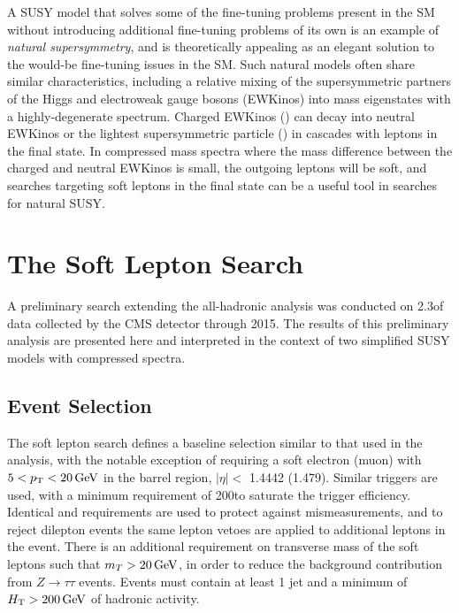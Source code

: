 A SUSY model that solves some of the fine-tuning problems present in the SM without introducing additional fine-tuning problems of its own is an example of {\it natural supersymmetry}, and is theoretically appealing as an elegant solution to the would-be fine-tuning issues in the SM. Such natural models often share similar characteristics, including a relative mixing of the supersymmetric partners of the Higgs and electroweak gauge bosons (EWKinos) into mass eigenstates with a highly-degenerate spectrum. Charged EWKinos (\chipm) can decay into neutral EWKinos or the lightest supersymmetric particle (\chiz) in cascades with leptons in the final state. In compressed mass spectra where the mass difference between the charged and neutral EWKinos is small, the outgoing leptons will be soft, and searches targeting soft leptons in the final state can be a useful tool in searches for natural SUSY.

\section{The Soft Lepton Search}
\label{sec:softlep}

A preliminary search extending the all-hadronic analysis was conducted on 2.3\fbinv of data collected by the CMS detector through 2015. The results of this preliminary analysis are presented here and interpreted in the context of two simplified SUSY models with compressed spectra.

\subsection{Event Selection}
\label{subsec:softevents}
The soft lepton search defines a baseline selection similar to that used in the \mttwo analysis, with the notable exception of requiring a soft electron (muon) with $5 < p_{\mathrm{T}} < 20\,\text{Ge\hspace{-.08em}V}$ in the barrel region, $|\eta| <$ 1.4442 (1.479). Similar \MET triggers are used, with a minimum \MET requirement of 200\GeV to saturate the trigger efficiency. Identical \dphilong and \htovermet requirements are used to protect against \MET mismeasurements, and
to reject dilepton events the same lepton vetoes are applied to additional leptons in the event. There is an additional requirement on transverse mass of the soft leptons such that $m_T > 20\,\text{Ge\hspace{-.08em}V}$, in order to reduce the background contribution from $Z\rightarrow\tau\tau$ events. Events must contain at least 1 jet and a minimum of $H_{\mathrm{T}} > 200\,\text{Ge\hspace{-.08em}V}$ of hadronic activity.

